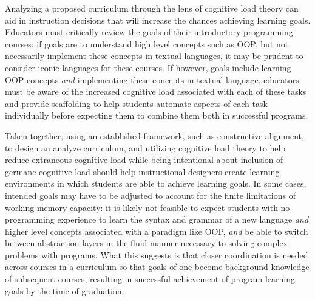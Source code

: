 \documentclass[12pt]{article}
\begin{document}
Analyzing a proposed curriculum through the lens of cognitive load
theory can aid in instruction decisions that will increase the chances
achieving learning goals. Educators must critically review the goals
of their introductory programming courses: if goals are to understand
high level concepts such as OOP, but not necessarily implement these
concepts in textual languages, it may be prudent to consider iconic
languages for these courses. If however, goals include learning OOP
concepts \emph{and} implementing these concepts in textual language,
educators must be aware of the increased cognitive load associated
with each of these tasks and provide scaffolding to help students
automate aspects of each task individually before expecting them to
combine them both in successful programs.

Taken together, using an established framework, such as constructive
alignment, to design an analyze curriculum, and utilizing cognitive
load theory to help reduce extraneous cognitive load while being
intentional about inclusion of germane cognitive load should help
instructional designers create learning environments in which students
are able to achieve learning goals. In some cases, intended goals may
have to be adjusted to account for the finite limitations of working
memory capacity: it is likely not feasible to expect students with no
programming experience to learn the syntax and grammar of a new
language \emph{and} higher level concepts associated with a paradigm
like OOP, \emph{and} be able to switch between abstraction layers in
the fluid manner necessary to solving complex problems with
programs. What this suggests is that closer coordination is needed
across courses in a curriculum so that goals of one become background
knowledge of subsequent courses, resulting in successful achievement
of program learning goals by the time of graduation.

\end{document}
